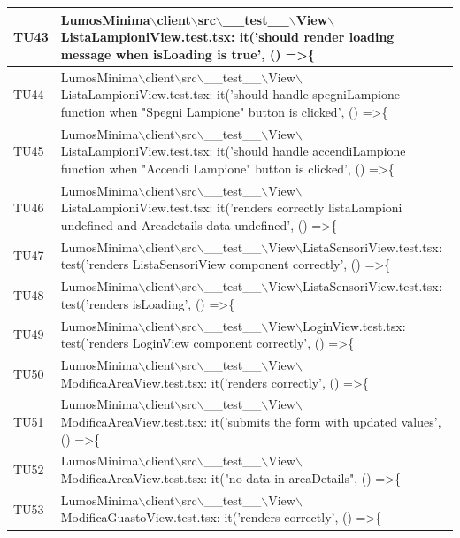 \documentclass[12pt]{article}
\begin{document}
\begin{xltabular}{\linewidth}{|>{\hsize}X|X|}
	TU43 & LumosMinima$\backslash$client$\backslash$src$\backslash$\_\_test\_\_$\backslash$View$\backslash$ListaLampioniView.test.tsx: it('should render loading message when isLoading is true', () =\textgreater \{ \\ \hline
	TU44 & LumosMinima$\backslash$client$\backslash$src$\backslash$\_\_test\_\_$\backslash$View$\backslash$ListaLampioniView.test.tsx: it('should handle spegniLampione function when "Spegni Lampione" button is clicked', () =\textgreater \{ \\ \hline
	TU45 & LumosMinima$\backslash$client$\backslash$src$\backslash$\_\_test\_\_$\backslash$View$\backslash$ListaLampioniView.test.tsx: it('should handle accendiLampione function when "Accendi Lampione" button is clicked', () =\textgreater \{ \\ \hline
	TU46 & LumosMinima$\backslash$client$\backslash$src$\backslash$\_\_test\_\_$\backslash$View$\backslash$ListaLampioniView.test.tsx: it('renders correctly listaLampioni undefined and Areadetails data undefined', () =\textgreater \{ \\ \hline
	TU47 & LumosMinima$\backslash$client$\backslash$src$\backslash$\_\_test\_\_$\backslash$View$\backslash$ListaSensoriView.test.tsx: test('renders ListaSensoriView component correctly', () =\textgreater \{ \\ \hline
	TU48 & LumosMinima$\backslash$client$\backslash$src$\backslash$\_\_test\_\_$\backslash$View$\backslash$ListaSensoriView.test.tsx: test('renders isLoading', () =\textgreater \{ \\ \hline
	TU49 & LumosMinima$\backslash$client$\backslash$src$\backslash$\_\_test\_\_$\backslash$View$\backslash$LoginView.test.tsx: test('renders LoginView component correctly', () =\textgreater \{ \\ \hline
	TU50 & LumosMinima$\backslash$client$\backslash$src$\backslash$\_\_test\_\_$\backslash$View$\backslash$ModificaAreaView.test.tsx: it('renders correctly', () =\textgreater \{ \\ \hline
	TU51 & LumosMinima$\backslash$client$\backslash$src$\backslash$\_\_test\_\_$\backslash$View$\backslash$ModificaAreaView.test.tsx: it('submits the form with updated values', () =\textgreater \{ \\ \hline
	TU52 & LumosMinima$\backslash$client$\backslash$src$\backslash$\_\_test\_\_$\backslash$View$\backslash$ModificaAreaView.test.tsx: it("no data in areaDetails", () =\textgreater \{ \\ \hline
	TU53 & LumosMinima$\backslash$client$\backslash$src$\backslash$\_\_test\_\_$\backslash$View$\backslash$ModificaGuastoView.test.tsx: it('renders correctly', () =\textgreater \{ \\ \hline

\end{xltabular}
\end{document}
